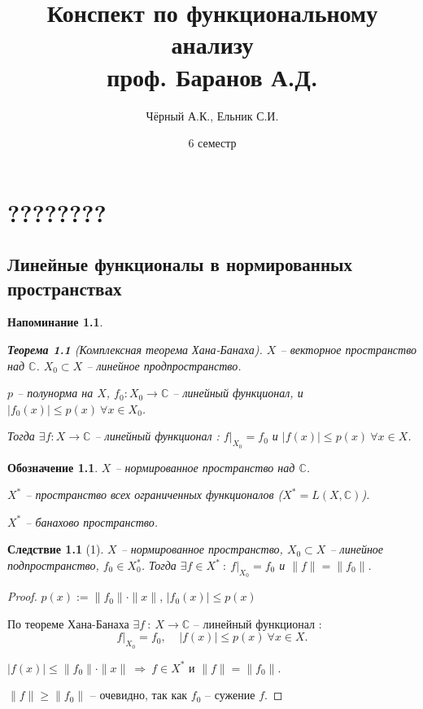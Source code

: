 \documentclass[12pt,a4paper]{report}
\author{Чёрный А.К., Ельник С.И.}
\title{Конспект по функциональному анализу \\ проф. Баранов А.Д.}
\date{6 семестр}
\newcommand{\then}{\ \Longrightarrow \ }
\renewcommand{\C}{\mathbb{C}}
\newtheorem*{thmnn}{Теорема}
\newtheorem*{con}{Следствие}
\newtheorem*{notation}{Напоминание}
\newtheorem*{design}{Обозначение}
\begin{document}
\maketitle

\setcounter{chapter}{5}

\chapter{????????}

\setcounter{section}{97}
\section{Линейные функционалы в нормированных пространствах}

\begin{notation}
\begin{thmnn}[Комплексная теорема Хана-Банаха]
$X$ -- векторное пространство над $\C$. $X_0 \subset X$ -- линейное продпространство.

$p$ -- полунорма на $X$, $f_0: X_0 \to \C$ -- линейный функционал, и $|f_0(x)| \le p(x) \ \forall x \in X_0$.

Тогда $\exists f : X \to \C$ -- линейный функционал : $f \big|_{X_0} = f_0$ и $|f(x) | \le p(x) \ \forall x \in X$.

\end{thmnn}
\end{notation}

\begin{design}
$X$ -- нормированное пространство над $\C$.

$X^*$ -- пространство всех ограниченных функционалов ($X^* = L(X,\C)$).

$X^*$ -- банахово пространство.
\end{design}

\begin{con}[1]
$X$ -- нормированное пространство, $X_0 \subset X$ -- линейное подпространство, $f_0 \in X^*_0$. Тогда $\exists f \in X^* \ : \ f \big|_{X_0} = f_0$ и $\|f\| = \|f_0\|$.
\end{con}

\begin{proof}
$p(x) := \| f_0 \| \cdot \|x \|$, $|f_0(x)| \le p(x)$

По теореме Хана-Банаха $\exists f \ : \ X \to \C$ -- линейный функционал : 
$$f \big|_{X_0} = f_0,\ \ \ \ \ |f(x)| \le p(x) \ \forall x \in X.$$

$|f(x)| \le \|f_0 \| \cdot \|x\| \then f \in X^*$ и $\|f\| = \|f_0 \|$.

$\|f\| \ge \|f_0\|$ -- очевидно, так как $f_0$ -- сужение $f$.
\end{proof}
\end{document}

